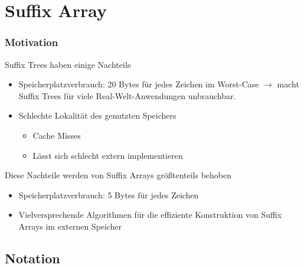 \documentclass{beamer}
\begin{document}
\section{Suffix Array}

\begin{frame}[fragile]
\frametitle{Motivation}
Suffix Trees haben einige Nachteile
\begin{itemize}
    \item Speicherplatzverbrauch: 20 Bytes für jedes Zeichen im Worst-Case $\rightarrow$ macht Suffix Trees für viele Real-Welt-Anwendungen unbrauchbar.
    \item Schlechte Lokalität des genutzten Speichers
        \begin{itemize}
            \item Cache Misses
            \item Lässt sich schlecht extern implementieren
        \end{itemize}
\end{itemize}
\vspace{5mm}
Diese Nachteile werden von Suffix Arrays größtenteils behoben
\begin{itemize}
    \item Speicherplatzverbrauch: 5 Bytes für jedes Zeichen
    \item Vielversprechende Algorithmen für die effiziente Konstruktion von Suffix Arrays im externen Speicher
\end{itemize}
\end{frame}

\subsection{Notation}
\end{document}
